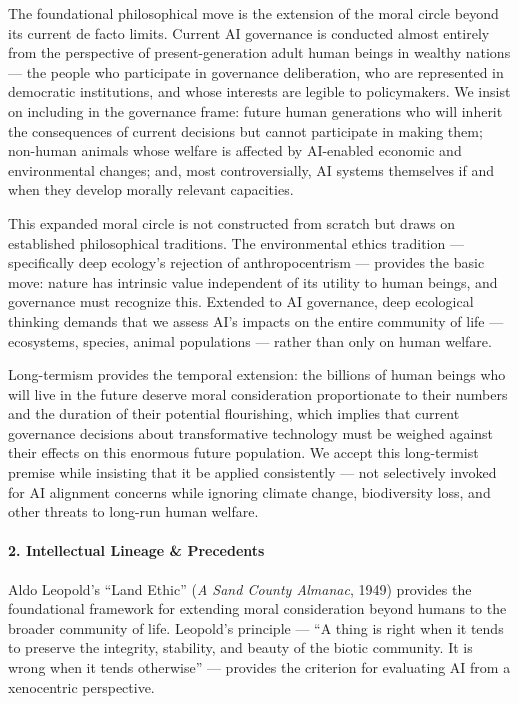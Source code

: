 The foundational philosophical move is the extension of the moral circle
beyond its current de facto limits. Current AI governance is conducted
almost entirely from the perspective of present-generation adult human
beings in wealthy nations --- the people who participate in governance
deliberation, who are represented in democratic institutions, and whose
interests are legible to policymakers. We insist on including in the
governance frame: future human generations who will inherit the
consequences of current decisions but cannot participate in making them;
non-human animals whose welfare is affected by AI-enabled economic and
environmental changes; and, most controversially, AI systems themselves
if and when they develop morally relevant capacities.

This expanded moral circle is not constructed from scratch but draws on
established philosophical traditions. The environmental ethics tradition
--- specifically deep ecology's rejection of anthropocentrism ---
provides the basic move: nature has intrinsic value independent of its
utility to human beings, and governance must recognize this. Extended to
AI governance, deep ecological thinking demands that we assess AI's
impacts on the entire community of life --- ecosystems, species, animal
populations --- rather than only on human welfare.

Long-termism provides the temporal extension: the billions of human
beings who will live in the future deserve moral consideration
proportionate to their numbers and the duration of their potential
flourishing, which implies that current governance decisions about
transformative technology must be weighed against their effects on this
enormous future population. We accept this long-termist premise while
insisting that it be applied consistently --- not selectively invoked
for AI alignment concerns while ignoring climate change, biodiversity
loss, and other threats to long-run human welfare.

\paragraph{2. Intellectual Lineage \&
Precedents}\label{intellectual-lineage-precedents-36}

Aldo Leopold's ``Land Ethic'' (\emph{A Sand County Almanac}, 1949)
provides the foundational framework for extending moral consideration
beyond humans to the broader community of life. Leopold's principle ---
``A thing is right when it tends to preserve the integrity, stability,
and beauty of the biotic community. It is wrong when it tends
otherwise'' --- provides the criterion for evaluating AI from a
xenocentric perspective.

